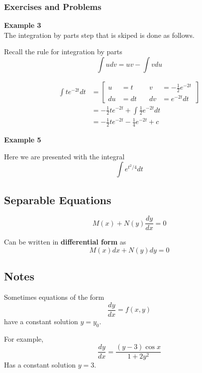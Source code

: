 \subsubsection{Exercises and Problems}

\textbf{Example 3}
\\

The integration by parts step that is skiped is done as follows.

Recall the rule for integration by parts
$$
\int u dv = uv - \int v du
$$

\begin{align*}
\int t e^{-2t} dt &= 
    \left[
      \begin{alignedat}{2}
      u  &= t   \quad & v  &= -\frac{1}{2}e^{-2t} \\
      du &= dt  \quad & dv &= e^{-2t} dt 
      \end{alignedat}\,
    \right] \\
&= -\frac{1}{2} t e^{-2t} + \int \frac{1}{2}e^{-2t} dt \\
&= -\frac{1}{2} t e^{-2t} - \frac{1}{4}e^{-2t} + c
\end{align*}





\textbf{Example 5}

Here we are presented with the integral
$$
\int e^{t^2/4} dt
$$


\subsection{Separable Equations}

$$
M(x) + N(y) \frac{dy}{dx} = 0
$$

Can be written in \textbf{differential form} as
$$
M(x)dx + N(y)dy = 0
$$


\subsection{Notes}

Sometimes equations of the form
$$
\frac{dy}{dx} = f(x,y)
$$
have a constant solution $y = y_0$.

For example,
$$
\frac{dy}{dx} = \frac{(y-3) \cos{x}}{1+2y^2}
$$
Has a constant solution $y=3$.
\\





